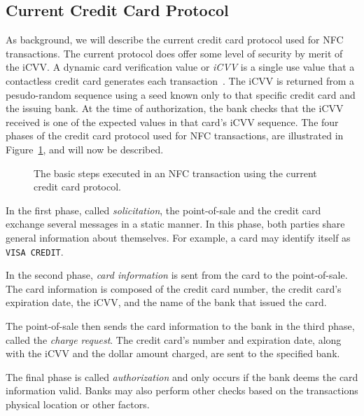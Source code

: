 \documentclass{sig-alternate}
\begin{document}
\subsection{Current Credit Card Protocol}
\label{sec:currentCC}
As background, we will describe the current credit card protocol used for NFC transactions. The current protocol does offer some level of security by merit of the iCVV. A dynamic card verification value or \textit{iCVV} is a single use value that a contactless credit card generates each transaction~\cite{wiki:iCVV}. The iCVV is returned from a pesudo-random sequence using a seed known only to that specific credit card and the issuing bank. At the time of authorization, the bank checks that the iCVV received is one of the expected values in that card's iCVV sequence. The four phases of the credit card protocol used for NFC transactions, are illustrated in Figure~\ref{fig:currentCC}, and will now be described.

\begin{figure}
\centering
{}
\caption{The basic steps executed in an NFC transaction using the current credit card protocol.
\cite{CC2016}}
\label{fig:currentCC}
\end{figure}

In the first phase, called \textit{solicitation}, the point-of-sale and the credit card exchange several messages in a static manner. In this phase, both parties share general information about themselves. For example, a card may identify itself as \texttt{VISA CREDIT}.

In the second phase, \textit{card information} is sent from the card to the point-of-sale. The card information is composed of the credit card number, the credit card's expiration date, the iCVV, and the name of the bank that issued the card.

The point-of-sale then sends the card information to the bank in the third phase, called the \textit{charge request}. The credit card's number and expiration date, along with the iCVV and the dollar amount charged, are sent to the specified bank.

The final phase is called \textit{authorization} and only occurs if the bank deems the card information valid. Banks may also perform other checks based on the transactions physical location or other factors.
\end{document}
